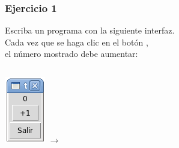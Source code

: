 \documentclass[12pt]{beamer}
\begin{document}
  \begin{frame}
    \label{ejercicio-mas-uno}
    \frametitle{Ejercicio 1}
    Escriba un programa con la siguiente interfaz. \\
    Cada vez que se haga clic en el botón , \\
    el número mostrado debe aumentar:
    \vfill

    \begin{columns}
        \includegraphics[width=\textwidth]{programas/tkinter/capturas/06-0.png}
        \(\longrightarrow\)

\end{columns}
\end{frame}
\end{document}

